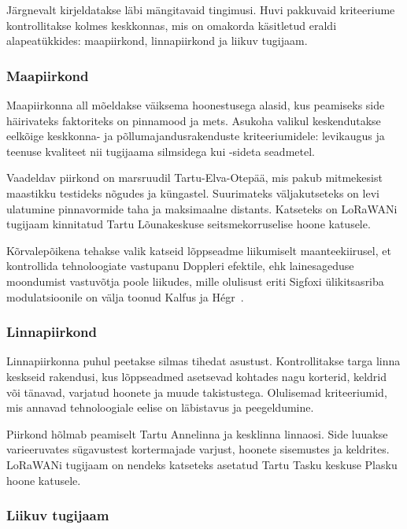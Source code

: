 \documentclass[12pt]{article}
\begin{document}
    Järgnevalt kirjeldatakse läbi mängitavaid tingimusi.
    Huvi pakkuvaid kriteeriume kontrollitakse kolmes keskkonnas, mis on omakorda käsitletud eraldi alapeatükkides: maapiirkond, linnapiirkond ja liikuv tugijaam.

    \subsubsection{Maapiirkond}

    Maapiirkonna all mõeldakse väiksema hoonestusega alasid, kus peamiseks side häirivateks faktoriteks on pinnamood ja mets.
    Asukoha valikul keskendutakse eelkõige keskkonna- ja põllumajandusrakenduste kriteeriumidele: levikaugus ja teenuse kvaliteet nii tugijaama silmsidega kui -sideta seadmetel.

    Vaadeldav piirkond on marsruudil Tartu-Elva-Otepää, mis pakub mitmekesist maastikku testideks nõgudes ja küngastel.
    Suurimateks väljakutseteks on levi ulatumine pinnavormide taha ja maksimaalne distants.
    Katseteks on LoRaWANi tugijaam kinnitatud Tartu Lõunakeskuse seitsmekorruselise hoone katusele.

    Kõrvalepõikena tehakse valik katseid lõppseadme liikumiselt maanteekiirusel, et kontrollida tehnoloogiate vastupanu Doppleri efektile, ehk lainesageduse moondumist vastuvõtja poole liikudes, mille olulisust eriti Sigfoxi ülikitsasriba modulatsioonile on välja toonud Kalfus ja Hégr~\cite{kalfus2016ultra}.

    \subsubsection{Linnapiirkond}

    Linnapiirkonna puhul peetakse silmas tihedat asustust.
    Kontrollitakse targa linna keskseid rakendusi, kus lõppseadmed asetsevad kohtades nagu korterid, keldrid või tänavad, varjatud hoonete ja muude takistustega.
    Olulisemad kriteeriumid, mis annavad tehnoloogiale eelise on läbistavus ja peegeldumine.

    Piirkond hõlmab peamiselt Tartu Annelinna ja kesklinna linnaosi.
    Side luuakse varieeruvates sügavustest kortermajade varjust, hoonete sisemustes ja keldrites.
    LoRaWANi tugijaam on nendeks katseteks asetatud Tartu Tasku keskuse Plasku hoone katusele.

    \subsubsection{Liikuv tugijaam}
\end{document}
